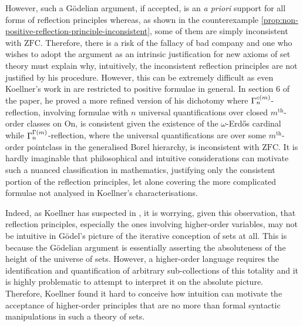 \documentclass[12pt]{article}
\theoremstyle{plain}
\theoremstyle{definition}
\newcommand{\ZFC}{\mathrm{ZFC}}
\newcommand{\On}{\mathrm{On}}
\begin{document}
However, such a G\"odelian argument, if accepted, is an \emph{a priori} support for all forms of reflection principles whereas, as shown in the counterexample \autoref{prop:non-positive-reflection-principle-inconsistent}, some of them are simply inconsistent with $\ZFC$. Therefore, there is a risk of the fallacy of bad company and one who wishes to adopt the argument as an intrinsic justification for new axioms of set theory must explain why, intuitively, the inconsistent reflection principles are not justified by his procedure. However, this can be extremely difficult as even Koellner's work in \cite{reflection-principles} are restricted to positive formulae in general. In section 6 of the paper, he proved a more refined version of his dichotomy where $\Gamma^{c\mleft(m\mright)}_n$-reflection, involving formulae with $n$ universal quantifications over closed $m^\text{th}$-order classes on $\On$, is consistent given the existence of the $\omega$-Erd\H{o}s cardinal while $\Gamma^{\Gamma\mleft(m\mright)}_n$-reflection, where the universal quantifications are over some $m^\text{th}$-order pointclass in the generalised Borel hierarchy, is inconsistent with $\ZFC$. It is hardly imaginable that philosophical and intuitive considerations can motivate such a nuanced classification in mathematics, justifying only the consistent portion of the reflection principles, let alone covering the more complicated formulae not analysed in Koellner's characterisations.

Indeed, as Koellner has suspected in \cite{reflection-principles}, it is worrying, given this observation, that reflection principles, especially the ones involving higher-order variables, may not be intuitive in G\"odel's picture of the iterative conception of sets at all. This is because the G\"odelian argument is essentially asserting the absoluteness of the height of the universe of sets. However, a higher-order language requires the identification and quantification of arbitrary sub-collections of this totality and it is highly problematic to attempt to interpret it on the absolute picture. Therefore, Koellner found it hard to conceive how intuition can motivate the acceptance of higher-order principles that are no more than formal syntactic manipulations in such a theory of sets.
\end{document}
